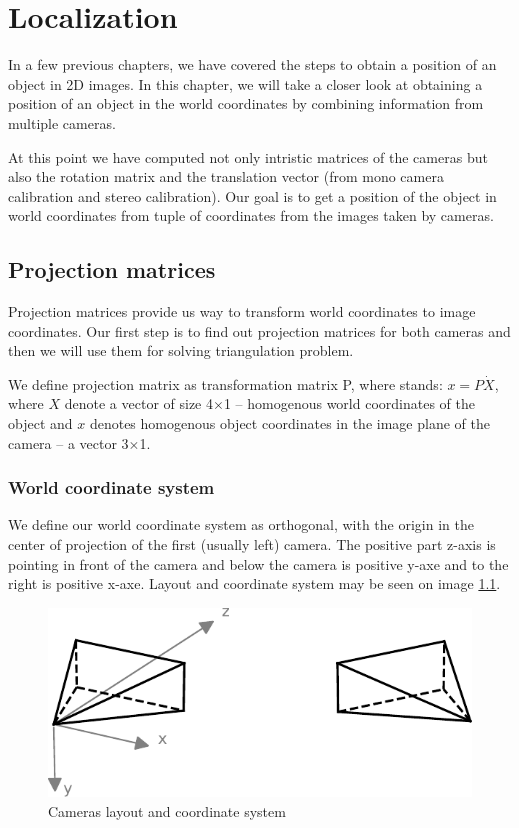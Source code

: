 \chapter{Localization}

In a few previous chapters, we have covered the steps to obtain a position of
an object in 2D images. In this chapter, we will take a closer look at
obtaining a position of an object in the world coordinates by combining
information from multiple cameras.

At this point we have computed not only intristic matrices of the cameras but
also the rotation matrix and the translation vector (from mono camera
calibration and stereo calibration). Our goal is to get a position of the
object in world coordinates from tuple of coordinates from the images taken by
cameras.

\section{Projection matrices}
Projection matrices provide us way to transform world coordinates to image
coordinates. Our first step is to find out projection matrices for both cameras
and then we will use them for solving triangulation problem.

We define projection matrix as transformation matrix P, where stands: $x = P
\dot X$, where $X$ denote a vector of size 4$\times$1 -- homogenous world coordinates
of the object and $x$ denotes homogenous object coordinates in the image plane
of the camera -- a vector 3$\times$1.

\subsection{World coordinate system}
We define our world coordinate system as orthogonal, with the origin in the
center of projection of the first (usually left) camera. The positive part
z-axis is pointing in front of the camera and below the camera is positive
y-axe and to the right is positive x-axe. Layout and coordinate system may be
seen on image \ref{fig:coordinate-system}.

\begin{figure}
\centering
\includegraphics{img/camera-positions}
\caption{Cameras layout and coordinate system}
\label{fig:coordinate-system}
\end{figure}

